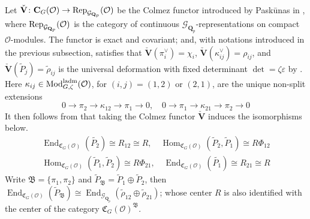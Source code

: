 \documentclass[leqno]{amsart}
\newcommand{\Gp}{\mathcal{G}_{\Qp}} %
\newcommand{\laMod}{\textnormal{Mod}^{\textnormal{ladm}}}
\newcommand{\Rep}{\textnormal{Rep}}
\newcommand{\V}{\check{\mathbf{V}}} %
\newcommand{\Qp}{\mathbf{Q}_p}
\newcommand{\C}{\mathbf C}
\newcommand{\oo}{\mathcal O}
\newcommand{\1}{\mathbf{1}}
\newcommand{\fC}{\mathfrak C}
\newcommand{\B}{\mathfrak B}
\DeclareMathOperator{\End}{End}
\DeclareMathOperator{\Hom}{Hom}
\theoremstyle{definition}
\theoremstyle{remark}
\begin{document}
Let $\V\colon \C_G(\oo)\to \Rep_{\Gp}(\oo)$
be the Colmez functor introduced by Pask\={u}nas
in \cite[\S 5.7]{pask},
where 
$\Rep_{\Gp}(\oo)$
is the category of continuous $\Gp$-representations
on compact $\oo$-modules.
The functor is exact and covariant;
and, with notations introduced 
in the previous subsection, satisfies that
$\V(\pi_i^\vee)=\chi_i$,
$\V(\kappa_{ij}^\vee)=\rho_{ij}$,
and $\V(\tilde{P}_j)=\tilde{\rho}_{ij}$
is the universal deformation
with fixed determinant $\det=\zeta\varepsilon$
by \cite[Cor 8.7]{pask}.
Here
$\kappa_{ij}\in \laMod_{G,\zeta}(\oo)$,
for $(i,j)=(1,2)$ or  $(2,1)$,
are the unique non-split extensions
\[
	0\to \pi_2\to \kappa_{12}\to \pi_1\to 0,\quad
	0\to \pi_1\to \kappa_{21}\to \pi_2\to 0
\]
It then follows from \cite[Lem 8.10]{pask} that 
taking the Colmez functor 
$\V$ induces the isomorphisms below.
\begin{equation}\label{eq:end_def}
\begin{split}
	\End_{\fC_{G}(\oo)}(\tilde{P_2})\cong R_{12}\cong R,\quad
	\Hom_{\fC_G(\oo)}(\tilde{P}_2, \tilde{P}_1)\cong R\Phi_{12}\\
	\Hom_{\fC_G(\oo)}(\tilde{P}_1, \tilde{P}_2)\cong R\Phi_{21},\quad
	\End_{\fC_{G}(\oo)}(\tilde{P_1})\cong R_{21}\cong R
\end{split}
\end{equation}
Write $\B=\{\pi_1,\pi_2\}$ 
and $ \tilde{P}_\B=\tilde{P}_1\oplus \tilde{P}_2$,
then $\End_{\fC_G(\oo)}(\tilde{P}_\B)\cong 
\End_{\Gp}(\tilde{\rho}_{12}\oplus \tilde{\rho}_{21})$;
whose center $R$ is also identified with 
the center of the category $\fC_G(\oo)^\B$.
\end{document}
